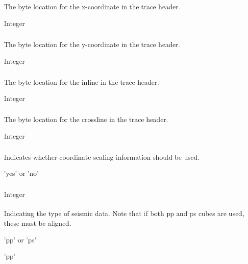 \subparagraph{}
 \slist
   \item \Description The byte location for the x-coordinate in the trace header.
   \item \Argument Integer
   \item \Default
 \elist

\subparagraph{}
 \slist
   \item \Description The byte location for the y-coordinate in the trace header.
   \item \Argument Integer
   \item \Default
 \elist

\subparagraph{}
 \slist
   \item \Description The byte location for the inline in the trace header.
   \item \Argument Integer
   \item \Default
 \elist

\subparagraph{}
 \slist
   \item \Description The byte location for the crossline in the trace header.
   \item \Argument Integer
   \item \Default
 \elist

\subparagraph{}
 \slist
   \item \Description Indicates whether coordinate scaling information should be used.
   \item \Argument 'yes' or 'no'
   \item \Default
 \elist

\subparagraph{}
 \slist
   \item \Description
   \item \Argument Integer
   \item \Default
 \elist

\paragraph{}
 \slist
   \item \Description Indicating the type of seismic data. Note that if both pp and ps cubes are used, these must be aligned.
   \item \Argument 'pp' or 'ps'
   \item \Default 'pp'
 \elist

